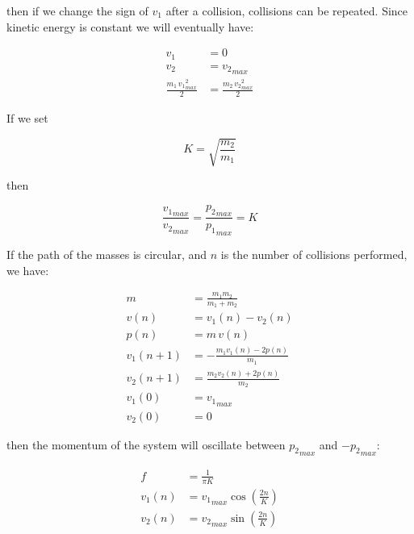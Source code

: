 \documentclass[]{../common/elementary-physics}
\begin{document}
then if we change the sign of $v_1$ after a collision, collisions can be repeated.
Since kinetic energy is constant we will eventually have:

\begin{subequations}
\begin{align}
v_1 &= 0 \\
v_2 &= {v_2}_{max} \\
\frac{m_1 \, {v_1}_{max}^2}{2} &= \frac{m_2 \, {v_2}_{max}^2}{2}
\end{align}
\end{subequations}

If we set

\begin{equation}
K = \sqrt{\frac{m_2}{m_1}}
\end{equation}

then

\begin{equation}
\frac{{v_1}_{max}}{{v_2}_{max}} = \frac{{p_2}_{max}}{{p_1}_{max}} = K
\end{equation}

If the path of the masses is circular, and $n$ is the number of collisions performed, we have:

\begin{subequations}
\begin{align}
m &= \frac{m_1 m_2}{m_1 + m_2} \\
v(n) &= v_1(n) - v_2(n) \\
p(n) &= m \, v(n) \\
v_1(n+1) &= -\frac{m_1 v_1(n) - 2p(n)}{m_1} \\
v_2(n+1) &= \frac{m_2 v_2(n) + 2p(n)}{m_2} \\
v_1(0) &= {v_1}_{max} \\
v_2(0) &= 0
\end{align}
\end{subequations}

then the momentum of the system will oscillate between ${p_2}_{max}$ and $-{p_2}_{max}$:

\begin{subequations}
\begin{align}
f &= \frac{1}{\pi K} \\
v_1(n) &= {v_1}_{max} \cos (\frac{2n}{K}) \\
v_2(n) &= {v_2}_{max} \sin (\frac{2n}{K})
\end{align}
\end{subequations}
\end{document}
